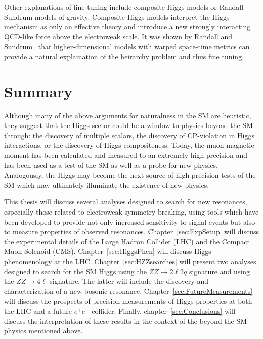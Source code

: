 Other explanations of fine tuning include composite Higgs models
or Randall-Sundrum models of gravity.  Composite Higgs models 
interpret the Higgs mechanism as only an effective theory and
introduce a new strongly interacting QCD-like force above the 
electroweak scale.  It was shown by Randall and 
Sundrum~\cite{Randall:1999ee} that
higher-dimensional models with warped space-time metrics can 
provide a natural explaination of the heirarchy problem and
thus fine tuning.

\section{Summary}

Although many of the above arguments for naturalness in the SM 
are heuristic, they suggest that the Higgs sector could be a 
window to physics beyond
the SM through: the discovery of multiple scalars,
the discovery of CP-violation in Higgs interactions,
or the discovery of Higgs compositeness.  Today, the muon 
magnetic moment has been calculated and measured 
to an extremely high precision and has been used as a 
test of the SM as well as a probe for new physics.
Analogously, the Higgs may become the next source of high 
precision tests of the SM which may
ultimately illuminate the existence of new physics.

This thesis will discuss several analyses designed to search for 
new resonances, especially those related to electroweak symmetry 
breaking, using tools which have been developed to provide not only 
increased sensitivity to signal events but also to measure 
properties of observed resonances. 
Chapter~\ref{sec:ExpSetup} will 
discuss the experimental details of the Large Hadron Collider 
(LHC) and the Compact Muon Solenoid (CMS). 
Chapter~\ref{sec:HiggsPhen} will discuss Higgs phenomenology 
at the LHC.  Chapter~\ref{sec:HZZsearches} will
present two analyses designed to search for the SM Higgs using the 
$ZZ\to2\ell 2q$ signature and using the $ZZ\to 4\ell$ signature. 
The latter will include the discovery and characterization of 
a new bosonic resonance. Chapter~\ref{sec:FutureMeasurements} 
will discuss the prospects of precision measurements of Higgs 
properties at both the LHC and a future $e^+e^-$ collider. Finally, 
chapter~\ref{sec:Conclusions} will discuss the interpretation 
of these results in the context of the beyond the SM physics 
mentioned above.  
